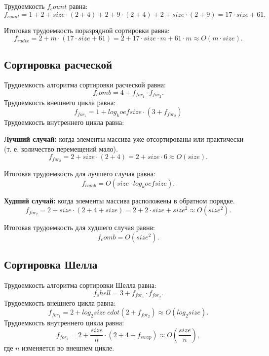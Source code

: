 Трудоемкость $f_count$ равна:
\begin{equation}
	f_{count} = 1 + 2 + size \cdot (2 + 4) + 2 + 9 \cdot(2 + 4) + 2 + size \cdot (2 + 9) = 17 \cdot size + 61.
\end{equation}

Итоговая трудоемкость поразрядной сортировки равна:
\begin{equation}
	f_{radix} = 2 + m \cdot (17 \cdot size + 61) = 2 + 17 \cdot size \cdot m + 61 \cdot m \approx O(m \cdot size).
\end{equation}

\subsection*{Сортировка расческой}
Трудоемкость алгоритма сортировки расческой равна:
\begin{equation}
	f_comb = 4 + f_{for_1} \cdot f_{for_2}.
\end{equation}
Трудоемкость внешнего цикла равна:
\begin{equation}
	f_{for_1} = 1 + log_koef{size} \cdot(3 + f_{for_2}) 
\end{equation}
Трудоемкость внутреннего цикла равна:

\textbf{Лучший случай:} когда элементы массива уже отсортированы или практически (т. е. количество перемещений мало).
\begin{equation}
	f_{for_2} = 2 + size \cdot(2 + 4) =  2 + size \cdot 6 \approx O(size).
\end{equation}

Итоговая трудоемкость для лучшего случая равна: 
\begin{equation}
	f_{comb} = O(size \cdot log_koef{size}).
\end{equation}

\textbf{Худший случай:} когда элементы массива расположены в обратном порядке.
\begin{equation}
	f_{for_2} = 2 + size \cdot(2 + 4 + size) =  2 + 2 \cdot size + size^2 \approx O(size^2).
\end{equation}

Итоговая трудоемкость для худшего случая равнв: 
\begin{equation}
	f_comb = O(size^2).
\end{equation}

\subsection*{Сортировка Шелла}
Трудоемкость алгоритма сортировки Шелла равна:
\begin{equation}
	f_shell = 3 + f_{for_1} \cdot f_{for_2}.
\end{equation}
Трудоемкость внешнего цикла равна:
\begin{equation}
	f_{for_1} = 2 + log_2{size} \ cdot (2 + f_{for_2}) \approx O(log_2{size}) .
\end{equation}
Трудоемкость внутреннего цикла равна:
\begin{equation}
	f_{for_2} = 2 + \frac{size}{n} \cdot (2 + 4 + f_{swap}) \approx O(\frac{size}{n}), 
\end{equation}
где $n$ изменяется во внешнем цикле.

